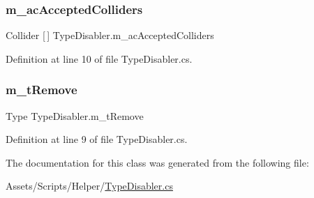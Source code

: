 \subsubsection{\texorpdfstring{m\+\_\+ac\+Accepted\+Colliders}{m\_acAcceptedColliders}}
{\footnotesize\ttfamily Collider \mbox{[}$\,$\mbox{]} Type\+Disabler.\+m\+\_\+ac\+Accepted\+Colliders}



Definition at line 10 of file Type\+Disabler.\+cs.

\mbox{\label{class_type_disabler_a7418c0a584908fe09a45613a1297f3f3}} 
\subsubsection{\texorpdfstring{m\+\_\+t\+Remove}{m\_tRemove}}
{\footnotesize\ttfamily Type Type\+Disabler.\+m\+\_\+t\+Remove}



Definition at line 9 of file Type\+Disabler.\+cs.



The documentation for this class was generated from the following file\+:\begin{DoxyCompactItemize}
\item 
Assets/\+Scripts/\+Helper/\mbox{\hyperlink{_type_disabler_8cs}{Type\+Disabler.\+cs}}\end{DoxyCompactItemize}
